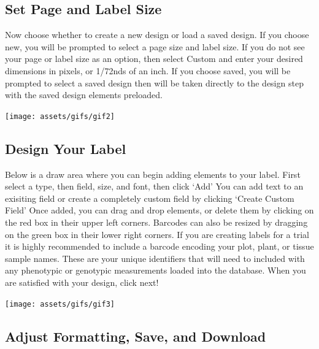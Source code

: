 \documentclass[
  12pt,
]{book}
\begin{document}
\hypertarget{set-page-and-label-size}{%
\subsection{Set Page and Label Size}\label{set-page-and-label-size}}

Now choose whether to create a new design or load a saved design. If you choose new, you will be prompted to select a page size and label size. If you do not see your page or label size as an option, then select Custom and enter your desired dimensions in pixels, or 1/72nds of an inch. If you choose saved, you will be prompted to select a saved design then will be taken directly to the design step with the saved design elements preloaded.

\begin{center}\texttt{[image: assets/gifs/gif2]} \end{center}

\hypertarget{design-your-label}{%
\subsection{Design Your Label}\label{design-your-label}}

Below is a draw area where you can begin adding elements to your label. First select a type, then field, size, and font, then click `Add' You can add text to an exisiting field or create a completely custom field by clicking `Create Custom Field' Once added, you can drag and drop elements, or delete them by clicking on the red box in their upper left corners. Barcodes can also be resized by dragging on the green box in their lower right corners. If you are creating labels for a trial it is highly recommended to include a barcode encoding your plot, plant, or tissue sample names. These are your unique identifiers that will need to included with any phenotypic or genotypic measurements loaded into the database. When you are satisfied with your design, click next!

\begin{center}\texttt{[image: assets/gifs/gif3]} \end{center}

\hypertarget{adjust-formatting-save-and-download}{%
\subsection{Adjust Formatting, Save, and Download}\label{adjust-formatting-save-and-download}}
\end{document}

